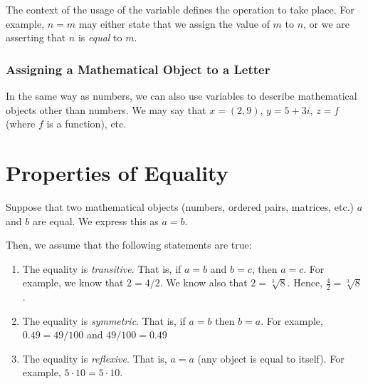 \documentclass[../proofs.tex]{subfiles}
\begin{document}
  The context of the usage of the variable defines the operation to take place.
  For example, $n = m$ may either state that we assign the value of $m$ to $n$,
  or we are asserting that $n$ is \emph{equal} to $m$.

  \subsubsection{Assigning a Mathematical Object to a Letter}
  In the same way as numbers, we can also use variables to describe mathematical
  objects other than numbers. We may say that $x = (2, 9)$, $y = 5 + 3i$,
  $z = f$ (where $f$ is a function), etc.

\begin{comment}
  \subsubsection{Theorems vs. Lemmas vs. Corollaries}
  What defines a theorem is obscure, but the general rule is as follows.
  A theorem describes some sort of large or powerful result, while a lemma
  describes a subordinate result (sometimes called a ``stepping stone") used to
  achieve a theorem. A corollary is a result that is an immediate consequence
  of a theorem.
\end{comment}

\section{Properties of Equality}
  Suppose that two mathematical objects (numbers, ordered pairs, matrices, etc.)
  $a$ and $b$ are equal. We express this as $a = b$.

  Then, we assume that the following statements are true:
  \begin{enumerate}[label=(\alph*)]
    \item The equality is \emph{transitive}. That is, if $a = b$ and $b = c$,
    then $a = c$. For example, we know that $2 = 4/2$. We know also that
    $2 = \sqrt[3]{8}$. Hence, $\frac{4}{2} = \sqrt[3]{8}$.

    \item The equality is \emph{symmetric}. That is, if $a = b$ then $b = a$.
    For example, $0.49 = 49/100$ and $49/100 = 0.49$

    \item The equality is \emph{reflexive}. That is, $a = a$ (any object is
    equal to itself). For example, $5 \cdot 10 = 5 \cdot 10.$
  \end{enumerate}
\end{document}
